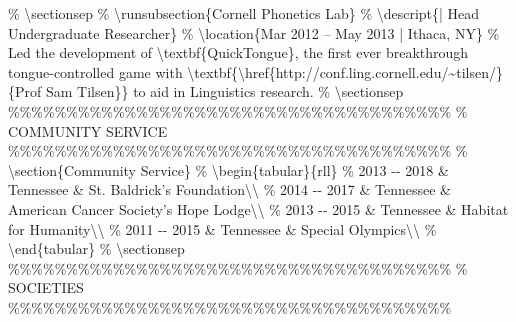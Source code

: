 \documentclass{article}%
\begin{document}
\% \textbackslash{}sectionsep\newline%
\newline%
\% \textbackslash{}runsubsection\{Cornell Phonetics Lab\}\newline%
\% \textbackslash{}descript\{| Head Undergraduate Researcher\}\newline%
\% \textbackslash{}location\{Mar 2012 – May 2013 | Ithaca, NY\}\newline%
\% Led the development of \textbackslash{}textbf\{QuickTongue\}, the first ever breakthrough tongue{-}controlled game with \textbackslash{}textbf\{\textbackslash{}href\{http://conf.ling.cornell.edu/\textasciitilde{}tilsen/\}\{Prof Sam Tilsen\}\} to aid in Linguistics research.\newline%
\% \textbackslash{}sectionsep\newline%
\newline%
\%\%\%\%\%\%\%\%\%\%\%\%\%\%\%\%\%\%\%\%\%\%\%\%\%\%\%\%\%\%\%\%\%\%\%\%\%\%\newline%
\%     COMMUNITY SERVICE\newline%
\%\%\%\%\%\%\%\%\%\%\%\%\%\%\%\%\%\%\%\%\%\%\%\%\%\%\%\%\%\%\%\%\%\%\%\%\%\%\newline%
\newline%
\% \textbackslash{}section\{Community Service\}\newline%
\newline%
\% \textbackslash{}begin\{tabular\}\{rll\}\newline%
\% 2013 {-}{-} 2018    \& Tennessee     \& St. Baldrick's Foundation\textbackslash{}\textbackslash{}\newline%
\% 2014 {-}{-} 2017	\& Tennessee     \& American Cancer Society's Hope Lodge\textbackslash{}\textbackslash{}\newline%
\% 2013 {-}{-} 2015    \& Tennessee     \& Habitat for Humanity\textbackslash{}\textbackslash{}\newline%
\% 2011 {-}{-} 2015    \& Tennessee     \& Special Olympics\textbackslash{}\textbackslash{}\newline%
\% \textbackslash{}end\{tabular\}\newline%
\% \textbackslash{}sectionsep\newline%
\newline%
\%\%\%\%\%\%\%\%\%\%\%\%\%\%\%\%\%\%\%\%\%\%\%\%\%\%\%\%\%\%\%\%\%\%\%\%\%\%\newline%
\%     SOCIETIES\newline%
\%\%\%\%\%\%\%\%\%\%\%\%\%\%\%\%\%\%\%\%\%\%\%\%\%\%\%\%\%\%\%\%\%\%\%\%\%\%\newline%
\end{document}
